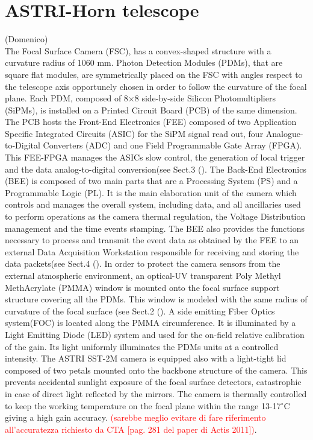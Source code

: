 \section{ASTRI-Horn telescope} (Domenico)\\
The Focal Surface Camera (FSC), has a 
convex-shaped structure with a curvature radius of 1060 mm.
Photon Detection Modules (PDMs), that are square flat modules, are symmetrically placed
on the FSC with angles respect to the telescope axis 
opportunely chosen in order to follow the curvature of the focal plane.
Each PDM, composed of 8$\times$8 side-by-side Silicon Photomultipliers (SiPMs), 
is installed on a Printed Circuit Board (PCB) 
of the same dimension.
The PCB hosts the Front-End Electronics (FEE) composed of
 two Application Specific Integrated Circuits (ASIC) for the SiPM signal read out,
four Analogue-to-Digital Converters (ADC) and one Field Programmable
Gate Array (FPGA). This FEE-FPGA manages the ASICs slow control,
the generation of local trigger and the data analog-to-digital conversion(see Sect.3 (\cite{Sottile2016}).
The Back-End Electronics (BEE) is composed of two main parts that are
a Processing System (PS) and a Programmable Logic (PL). 
It is the main elaboration unit of the camera which
controls and manages the overall system, including data, and
all ancillaries used to perform operations as
the camera thermal regulation, 
the Voltage Distribution management and the time events stamping.
The BEE also provides the functions necessary to
process and transmit the event data as 
obtained by the FEE to an external Data Acquisition 
Workstation responsible for receiving and storing
the data packets(see Sect.4 (\cite{Sottile2016}).
In order to protect the camera sensors from the external
atmospheric environment, an optical-UV transparent
Poly Methyl MethAcrylate (PMMA)  window 
is mounted onto the focal surface support structure covering all the
PDMs.
This window is modeled with the same radius of
curvature of the focal surface (see Sect.2 (\cite{Catalano2018}).
A side emitting Fiber Optics system(FOC) is located  along the PMMA 
circumference. It is illuminated by a Light Emitting Diode (LED) 
system and used for the on-field relative calibration of the gain. 
Its light uniformly illuminates the PDMs units at a controlled intensity.
The ASTRI SST-2M camera
is equipped also with a light-tight lid composed of two petals
mounted onto the backbone structure of the camera. 
This prevents accidental sunlight exposure of the focal surface
detectors, catastrophic in case of direct light reflected
by the mirrors.  
The camera is thermally controlled to keep the
working temperature on the focal plane within the range 13-17$^\circ$C
giving a high gain accuracy. \textcolor{red}{(sarebbe meglio evitare di fare riferimento all'accuratezza richiesto da CTA [pag. 281 del paper di Actis 2011])}.\\

